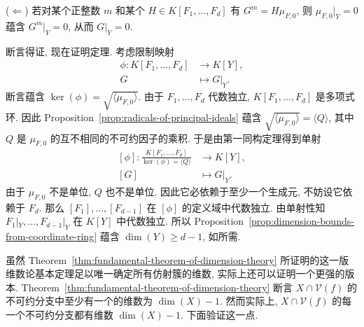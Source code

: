 \begin{Proof}
($\Leftarrow$) 若对某个正整数 $m$ 和某个 $H\in K[F_{1},\ldots,F_{d}]$ 有 $G^{m}=H\mu_{F,0}$, 则 $\mu_{F,0}|_{Y}=0$ 蕴含 $G^{m}|_{Y}=0$, 从而 $G|_{Y}=0$.

断言得证, 现在证明定理. 考虑限制映射
\[
  \begin{aligned}
    \phi:K[F_{1},\ldots,F_{d}]&\to K[Y],\\
    G&\mapsto G|_{Y}.
  \end{aligned}
\]
断言蕴含 $\ker(\phi)=\sqrt{\langle\mu_{F,0}\rangle}$. 由于 $F_{1},\ldots,F_{d}$ 代数独立, $K[F_{1},\ldots,F_{d}]$ 是多项式环. 因此 Proposition~\ref{prop:radicals-of-principal-ideals} 蕴含 $\sqrt{\langle\mu_{F,0}\rangle}=\langle Q\rangle$, 其中 $Q$ 是 $\mu_{F,0}$ 的互不相同的不可约因子的乘积. 于是由第一同构定理得到单射
\[
  \begin{aligned}
    [\phi]:\frac{K[F_{1},\ldots,F_{d}]}{\ker(\phi)=\langle Q\rangle}&\to K[Y],\\
    [G]&\mapsto G|_{Y}.
  \end{aligned}
\]
由于 $\mu_{F,0}$ 不是单位, $Q$ 也不是单位. 因此它必依赖于至少一个生成元, 不妨设它依赖于 $F_{d}$. 那么 $[F_{1}],\ldots,[F_{d-1}]$ 在 $[\phi]$ 的定义域中代数独立. 由单射性知 $F_{1}|_{Y},\ldots,F_{d-1}|_{Y}$ 在 $K[Y]$ 中代数独立. 所以 Proposition~\ref{prop:dimension-bounds-from-coordinate-ring} 蕴含 $\dim(Y)\geq d-1$, 如所需.
\end{Proof}

虽然 Theorem~\ref{thm:fundamental-theorem-of-dimension-theory} 所证明的这一版维数论基本定理足以唯一确定所有仿射簇的维数, 实际上还可以证明一个更强的版本. Theorem~\ref{thm:fundamental-theorem-of-dimension-theory} 断言 $X\cap\mathcal{V}(f)$ 的不可约分支中至少有一个的维数为 $\dim(X)-1$. 然而实际上, $X\cap\mathcal{V}(f)$ 的每一个不可约分支都有维数 $\dim(X)-1$. 下面验证这一点.

